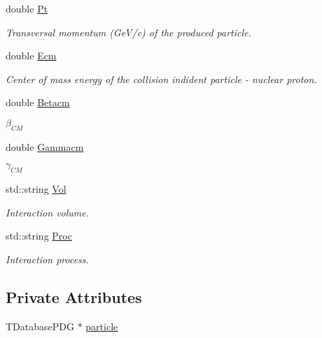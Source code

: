 \begin{DoxyCompactItemize}
double \hyperlink{class_neutrino_flux_reweight_1_1_interaction_data_a769e8d7c2862f32c3526e4fce963ec79}{Pt}
\begin{DoxyCompactList}\small\item\em Transversal momentum (Ge\-V/c) of the produced particle. \end{DoxyCompactList}\item 
double \hyperlink{class_neutrino_flux_reweight_1_1_interaction_data_af36c192af45b741e4daefeefb2c01815}{Ecm}
\begin{DoxyCompactList}\small\item\em Center of mass energy of the collision indident particle -\/ nuclear proton. \end{DoxyCompactList}\item 
double \hyperlink{class_neutrino_flux_reweight_1_1_interaction_data_ae6057e9361dbfa16fb2f1ea21798b16f}{Betacm}
\begin{DoxyCompactList}\small\item\em $ \beta_{CM} $ \end{DoxyCompactList}\item 
double \hyperlink{class_neutrino_flux_reweight_1_1_interaction_data_a2af597e9e7f334748c1121b4a7f4c861}{Gammacm}
\begin{DoxyCompactList}\small\item\em $ \gamma_{CM} $ \end{DoxyCompactList}\item 
std\-::string \hyperlink{class_neutrino_flux_reweight_1_1_interaction_data_afef1f2f1c9a0f59d076286f8fbc9083e}{Vol}
\begin{DoxyCompactList}\small\item\em Interaction volume. \end{DoxyCompactList}\item 
std\-::string \hyperlink{class_neutrino_flux_reweight_1_1_interaction_data_aee459302760758f034a4e045fed9d6af}{Proc}
\begin{DoxyCompactList}\small\item\em Interaction process. \end{DoxyCompactList}\end{DoxyCompactItemize}
\subsection*{Private Attributes}
\begin{DoxyCompactItemize}
\item 
T\-Database\-P\-D\-G $\ast$ \hyperlink{class_neutrino_flux_reweight_1_1_interaction_data_a18c64cbdb5ca45143f1e97de157d7f99}{particle}
\end{DoxyCompactItemize}


